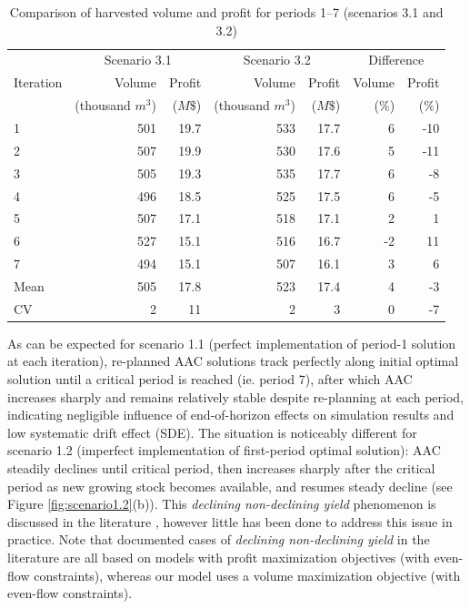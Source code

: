 \begin{table}[ht!]
\caption{Comparison of harvested volume and profit for periods 1--7 (scenarios 3.1 and 3.2)}
\label{tab:compare_volume-profit}
\renewcommand{\tabcolsep}{11pt}
\begin{tabular}{lrrrrrr}
\toprule
 & \multicolumn{2}{c}{Scenario 3.1} & \multicolumn{2}{c}{Scenario 3.2} & \multicolumn{2}{c}{Difference}\tabularnewline
Iteration & Volume & Profit & Volume & Profit & Volume & Profit\tabularnewline
 & (thousand $m^3$) & ($M\$$) & (thousand $m^3$) & ($M\$$) & ($\%$) & ($\%$)\tabularnewline
\midrule 
1 & 501 & 19.7 & 533 & 17.7 & 6 & -10\tabularnewline
2 & 507 & 19.9 & 530 & 17.6 & 5 & -11\tabularnewline
3 & 505 & 19.3 & 535 & 17.7 & 6 & -8\tabularnewline
4 & 496 & 18.5 & 525 & 17.5 & 6 & -5\tabularnewline
5 & 507 & 17.1 & 518 & 17.1 & 2 & 1\tabularnewline
6 & 527 & 15.1 & 516 & 16.7 & -2 & 11\tabularnewline
7 & 494 & 15.1 & 507 & 16.1 & 3 & 6\tabularnewline
\midrule 
Mean & 505  & 17.8 & 523 & 17.4 & 4 & -3 \tabularnewline
CV & 2 & 11 & 2 & 3 & 0 & -7 \tabularnewline
\bottomrule
\end{tabular}
\end{table}



As can be expected for scenario 1.1 (perfect implementation of
period-1 solution at each iteration), re-planned AAC solutions track
perfectly along initial optimal solution until a critical period is reached
(ie. period 7), after which AAC increases sharply and remains relatively
stable despite re-planning at each period, indicating negligible
influence of end-of-horizon effects on simulation results and low
systematic drift effect (SDE). The situation is noticeably different
for scenario 1.2 (imperfect implementation of first-period optimal
solution): AAC steadily declines until critical period, then increases sharply
after the critical period as new growing stock becomes available, and
resumes steady decline (see Figure \ref{fig:scenario1.2}(b)). This
\emph{declining non-declining yield} phenomenon is discussed in the
literature
\citep{mcquillan1986declining,daugherty1991credibility,gunn2007models},
however little has been done to address this issue in practice. Note
that documented cases of \emph{declining non-declining yield} in the
literature are all based on models with profit maximization objectives
(with even-flow constraints), whereas our model uses a volume
maximization objective (with even-flow constraints).

